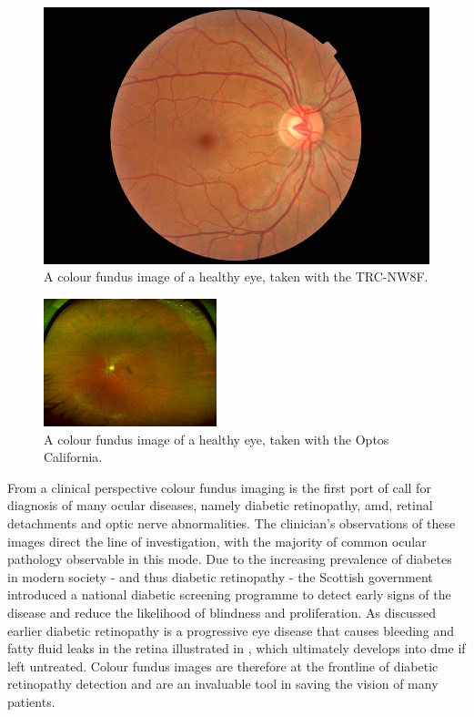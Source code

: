 \begin{figure}[H]
\centering
\includegraphics{figures/colourtrc}
\caption{A colour fundus image of a healthy eye, taken with the TRC-NW8F.\cite{1_topconmedical.com_2015}}
\label{fig:cf}
   \end{figure}

\begin{figure}[H]
\centering
\includegraphics{figures/optoscolour}
\caption{A colour fundus image of a healthy eye, taken with the Optos California.\cite{1_optos.com_2015}}
\label{fig:cfoptos}
   \end{figure}


From a clinical perspective colour fundus imaging is the first port of call
for diagnosis of many ocular diseases, namely diabetic retinopathy, \gls{amd}, retinal detachments and optic nerve abnormalities.\cite{3_medicine.uiowa.edu_2015} The clinician's
observations of these images direct the line of investigation, with the
majority of common ocular pathology observable in this mode. Due to
the increasing prevalence of diabetes in modern society - and thus
diabetic retinopathy - the Scottish government introduced a national diabetic screening programme to detect early signs of the disease and reduce the
likelihood of blindness and proliferation. As discussed earlier diabetic retinopathy is a progressive
eye disease that causes bleeding and fatty fluid leaks in the retina illustrated
in , which ultimately develops into \gls{dme} if
left untreated. Colour fundus images are therefore at the frontline of
diabetic retinopathy detection and are an invaluable tool in saving the vision
of many patients.

